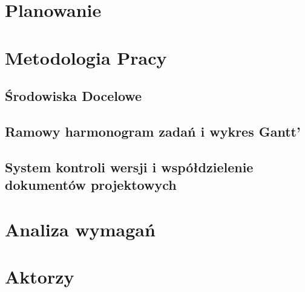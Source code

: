 
\chapter{Planowanie}
\label{ch:planowanie}

\chapter{Metodologia Pracy}
\label{ch:metodologia-pracy}


\section{Środowiska Docelowe}
\label{sec:srodowiska-docelowe}

\section{Ramowy harmonogram zadań i wykres Gantt’}
\label{sec:ramowy-harmonogram-zadan-i-wykres-gantt’}


\section{ System kontroli wersji i współdzielenie dokumentów projektowych}
\label{sec:-system-kontroli-wersji-i-wspoldzielenie-dokumentow-projektowych}




\chapter{Analiza wymagań}
\label{ch:analiza-wymagan}

\chapter{Aktorzy}
\label{ch:aktorzy}









